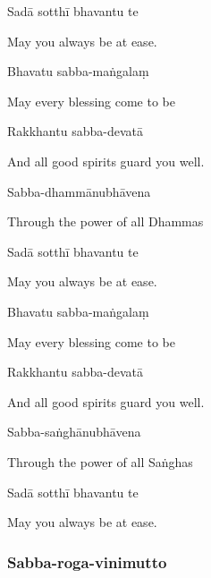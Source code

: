 Sadā sotthī bhavantu te

\begin{cprenglish}
  May you always be at ease.
\end{cprenglish}

Bhavatu sabba-maṅgalaṃ

\begin{cprenglish}
  May every blessing come to be
\end{cprenglish}

Rakkhantu sabba-devatā

\begin{cprenglish}
  And all good spirits guard you well.
\end{cprenglish}

Sabba-dhammānubhāvena

\begin{cprenglish}
  Through the power of all Dhammas
\end{cprenglish}

Sadā sotthī bhavantu te

\begin{cprenglish}
  May you always be at ease.
\end{cprenglish}

Bhavatu sabba-maṅgalaṃ

\begin{cprenglish}
  May every blessing come to be
\end{cprenglish}

Rakkhantu sabba-devatā

\begin{cprenglish}
  And all good spirits guard you well.
\end{cprenglish}

Sabba-saṅghānubhāvena

\begin{cprenglish}
  Through the power of all Saṅghas
\end{cprenglish}

Sadā sotthī bhavantu te

\begin{cprenglish}
  May you always be at ease.
\end{cprenglish}

\subsubsection{Sabba-roga-vinimutto}



